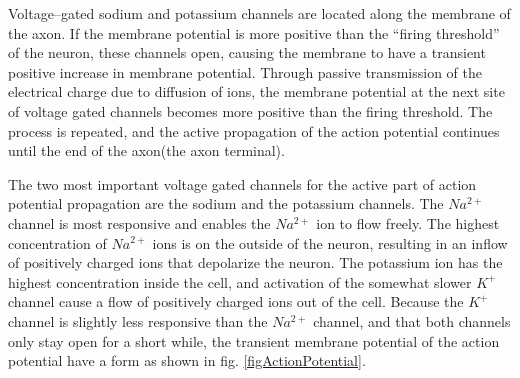		Voltage--gated sodium and potassium channels are located along the membrane of the axon.
		If the membrane potential is more positive than the ``firing threshold'' of the neuron, these channels open, causing the membrane to have a transient positive increase in membrane potential.
		Through passive transmission of the electrical charge due to diffusion of ions, the membrane potential at the next site of voltage gated channels becomes more positive than the firing threshold. %
		The process is repeated, and the active propagation of the action potential continues until the end of the axon(the axon terminal).
		\cite{PrinciplesOfNeuralScience4edKAP09}


		The two most important voltage gated channels for the active part of action potential propagation are the sodium and the potassium channels.
		The $Na^{2+}$ channel is most responsive and enables the $Na^{2+}$ ion to flow freely. %
		The highest concentration of $Na^{2+}$ ions is on the outside of the neuron, resulting in an inflow of positively charged ions that depolarize the neuron.
		The potassium ion has the highest concentration inside the cell, and activation of the somewhat slower $K^+$ channel cause a flow of positively charged ions out of the cell.
		Because the $K^+$ channel is slightly less responsive than the $Na^{2+}$ channel, and that both channels only stay open for a short while, 
			the transient membrane potential of the action potential have a form as shown in fig. \ref{figActionPotential}. 
		\cite{PrinciplesOfNeuralScience4edKAP09}
	

